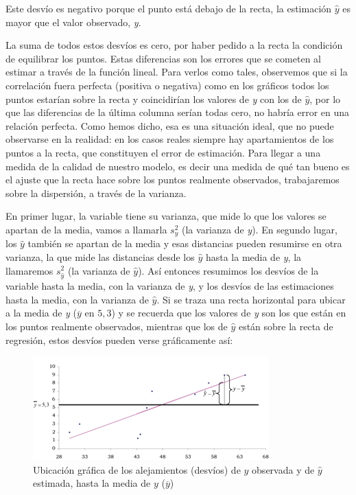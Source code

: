 \documentclass[]{book}
\begin{document}
Este desvío es negativo porque el punto está debajo de la recta, la
estimación \(\widehat{y}\) es mayor que el valor observado, \emph{y}.

La suma de todos estos desvíos es cero, por haber pedido a la recta la
condición de equilibrar los puntos. Estas diferencias son los errores
que se cometen al estimar a través de la función lineal. Para verlos
como tales, observemos que si la correlación fuera perfecta (positiva o
negativa) como en los gráficos todos los puntos estarían sobre la
recta y coincidirían los valores de \emph{y} con los de \(\widehat{y}\), por lo
que las diferencias de la última columna serían todas cero, no habría
error en una relación perfecta. Como hemos dicho, esa es una situación
ideal, que no puede observarse en la realidad: en los casos reales
siempre hay apartamientos de los puntos a la recta, que constituyen el
error de estimación. Para llegar a una medida de la calidad de nuestro
modelo, es decir una medida de qué tan bueno es el ajuste que la recta
hace sobre los puntos realmente observados, trabajaremos sobre la
dispersión, a través de la varianza.

En primer lugar, la variable tiene su varianza, que mide lo que los
valores se apartan de la media, vamos a llamarla \(s_{y}^{2}\) (la
varianza de \emph{y}). En segundo lugar, los \(\widehat{y}\) también se apartan
de la media y esas distancias pueden resumirse en otra varianza, la que
mide las distancias desde los \(\widehat{y}\) hasta la media de \emph{y}, la
llamaremos \(s_{\widehat{y}}^{2}\) (la varianza de \(\widehat{y}\)). Así
entonces resumimos los desvíos de la variable hasta la media, con la
varianza de \emph{y}, y los desvíos de las estimaciones hasta la media, con
la varianza de \(\widehat{y}\). Si se traza una recta horizontal para
ubicar a la media de \emph{y} (\(\overline{y}\) en \(5,3\)) y se recuerda que los
valores de \emph{y} son los que están en los puntos realmente observados,
mientras que los de \(\widehat{y}\) están sobre la recta de regresión,
estos desvíos pueden verse gráficamente así:

\begin{figure}

{\centering \includegraphics{imagenes/grafico14} 

}

\caption{Ubicación gráfica de los alejamientos (desvíos) de $y$ observada y de $\widehat{y}$ estimada, hasta la media de $y$ ($\overline{y}$)}\label{fig:unnamed-chunk-168}
\end{figure}
\end{document}
